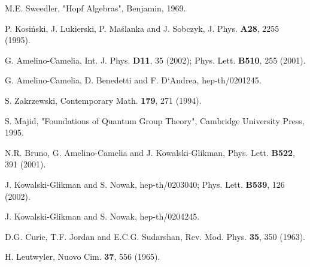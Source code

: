 \documentclass[a4paper,a4paper]{article}
\begin{document}
\begin{thebibliography}{99}
 M.E. Sweedler, "Hopf Algebras", Benjamin, 1969.

 P. Kosi\'{n}ski, J. Lukierski, P. Ma\'{s}lanka and
J. Sobczyk, J. Phys. {\bf A28}, 2255 (1995).

 G. Amelino-Camelia, Int. J. Phys. {\bf D11}, 35
(2002); Phys. Lett. {\bf B510}, 255 (2001).

 G. Amelino-Camelia, D. Benedetti and F. D`Andrea,
hep-th/0201245.

 S. Zakrzewski, Contemporary Math. {\bf 179}, 271
(1994).



 S. Majid, "Foundations of Quantum Group Theory",
Cambridge University Press, 1995.

 N.R. Bruno, G. Amelino-Camelia and J.
Kowalski-Glikman, Phys. Lett. {\bf B522}, 391 (2001).

 J. Kowalski-Glikman and S. Nowak, hep-th/0203040;
Phys. Lett. {\bf B539}, 126 (2002).

 J. Kowalski-Glikman and S. Nowak, hep-th/0204245.

 D.G. Curie, T.F. Jordan and E.C.G. Sudarshan, Rev. 
Mod.
Phys. {\bf 35}, 350 (1963).

 H. Leutwyler, Nuovo Cim. {\bf 37}, 556 (1965).
\end{thebibliography}
\end{document}
